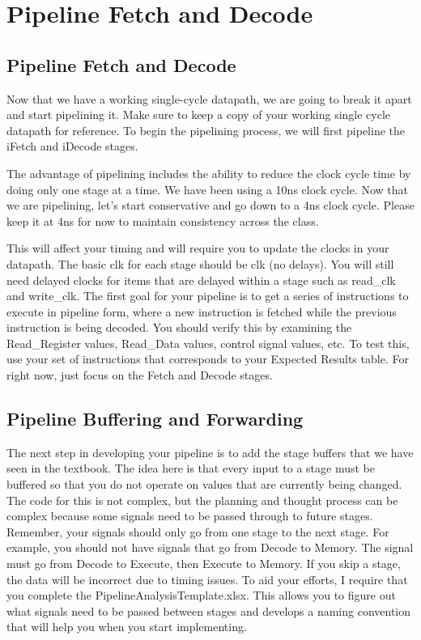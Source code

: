 \chapter{Pipeline Fetch and Decode}


\section{Pipeline Fetch and Decode}
Now that we have a working single-cycle datapath, we are going to break it apart and start pipelining it.  Make sure to keep a copy of your working single cycle datapath for reference.  To begin the pipelining process, we will first pipeline the iFetch and iDecode stages.

The advantage of pipelining includes the ability to reduce the clock cycle time by doing only one stage at a time.  We have been using a 10ns clock cycle.  Now that we are pipelining, let's start conservative and go down to a 4ns clock cycle.  Please keep it at 4ns for now to maintain consistency across the class.  

This will affect your timing and will require you to update the clocks in your datapath.  The basic clk for each stage should be clk (no delays).  You will still need delayed clocks for items that are delayed within a stage such as read\_clk and write\_clk.  The first goal for your pipeline is to get a series of instructions to execute in pipeline form, where a new instruction is fetched while the previous instruction is being decoded.  You should verify this by examining the Read\_Register values, Read\_Data values, control signal values, etc.  To test this, use your set of instructions that corresponds to your Expected Results table.  For right now, just focus on the Fetch and Decode stages.

\section{Pipeline Buffering and Forwarding}
The next step in developing your pipeline is to add the stage buffers that we have seen in the textbook.  The idea here is that every input to a stage must be buffered so that you do not operate on values that are currently being changed.  The code for this is not complex, but the planning and thought process can be complex because some signals need to be passed through to future stages.  Remember, your signals should only go from one stage to the next stage.  For example, you should not have signals that go from Decode to Memory.  The signal must go from Decode to Execute, then Execute to Memory.  If you skip a stage, the data will be incorrect due to timing issues.  To aid your efforts, I require that you complete the PipelineAnalysisTemplate.xlsx.  This allows you to figure out what signals need to be passed between stages and develops a naming convention that will help you when you start implementing. 

